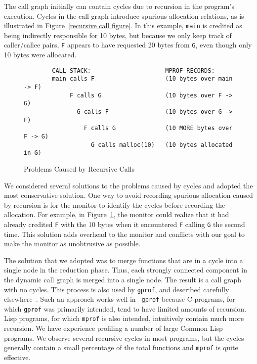 The call graph initially can contain cycles due to recursion in the
program's execution.  Cycles in the call graph introduce spurious
allocation relations, as is illustrated in Figure~\ref{recursive call
figure}.  In this example, {\tt main} is credited as being indirectly
responsible for 10 bytes, but because we only keep track of
caller/callee pairs, {\tt F} appears to have requested 20 bytes from
{\tt G}, even though only 10 bytes were allocated.

\begin{figure}[htbp]
\begin{verbatim}
        CALL STACK:                     MPROF RECORDS:
        main calls F                    (10 bytes over main -> F)
             F calls G                  (10 bytes over F -> G)
               G calls F                (10 bytes over G -> F)
                 F calls G              (10 MORE bytes over F -> G)
                   G calls malloc(10)   (10 bytes allocated in G)
\end{verbatim}
\caption{Problems Caused by Recursive Calls}
\label{recursive call figure}
\end{figure}

We considered several solutions to the problems caused by cycles and
adopted the most conservative solution.  One way to avoid recording
spurious allocation caused by recursion is for the monitor to identify
the cycles before recording the allocation.  For example, in
Figure~\ref{recursive call figure}, the monitor could realize that it
had already credited {\tt F} with the 10 bytes when it encountered
{\tt F} calling {\tt G} the second time.  This solution adds overhead
to the monitor and conflicts with our goal to make the monitor as
unobtrusive as possible.

The solution that we adopted was to merge functions that are in a
cycle into a single node in the reduction phase.  Thus, each strongly
connected component in the dynamic call graph is merged into a single
node.  The result is a call graph with no cycles.  This process is
also used by {\tt gprof}, and described carefully
elsewhere~\cite{graham83:gprof}.  Such an approach works well in {\tt
gprof} because C programs, for which {\tt gprof} was primarily
intended, tend to have limited amounts of recursion.  Lisp programs,
for which {\tt mprof} is also intended, intuitively contain much more
recursion.  We have experience profiling a number of large Common Lisp
programs.  We observe several recursive cycles in most programs, but
the cycles generally contain a small percentage of the total functions
and {\tt mprof} is quite effective.

